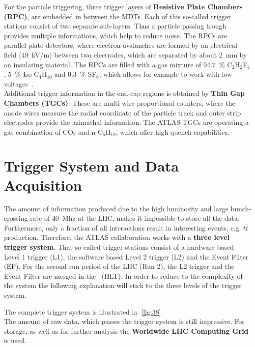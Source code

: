 \noindent For the particle triggering, three trigger layers of \textbf{Resistive Plate Chambers (RPC)}, are embedded  in between the MDTs. Each of this so-called trigger stations consist of two separate sub-layers. Thus a particle passing trough provides multiple informations, which help to reduce noise.  The RPCs are parallel-plate detectors, where electron avalanches are formed by an electrical field (49~kV/m) between two electrodes, which are separated by about 2~mm by an insulating material. The RPCs are filled with a gas mixture of 94.7~\%   C$_2$H$_2$F$_4$, 5~\% Iso-C$_4$H$_{10}$ and 0.3~\% SF$_6$, which allows for example to work with  low voltages~\cite{ATLAS:1999uwa}.\\ 

\noindent Additional trigger information in the end-cap regions is obtained by \textbf{Thin Gap Chambers (TGCs)}. These are multi-wire proportional counters, where the anode wires 
measure the radial coordinate of the particle track and outer strip electrodes provide the azimuthal information. The ATLAS TGCs are operating a gas combination of CO$_2$ and n-C$_5$H$_{12}$, which offer high quench capabilities.


\section{Trigger System and Data Acquisition}


\noindent The amount of information produced due to the  high luminosity and large bunch-crossing rate of 40~Mhz at the LHC, makes it impossible to store all the data. Furthermore, only a fraction of all interactions result in interesting events, e.g. $t\bar{t}$ production. Therefore, the ATLAS collaboration works with a \textbf{three level trigger system}. That so-called trigger stations consist of a hardware-based Level 1 trigger (L1), the software based Level 2 trigger (L2) and the Event Filter (EF). For the second run period of the LHC (Run 2), the L2 trigger and the Event Filter are merged in  the~ (HLT). In order to reduce to the complexity of the system the following explanation will stick to the three levels of the trigger system.


 The complete trigger system is illustrated in~\cref{fig:38} \\

\noindent The amount of raw data, which passes the trigger system is still impressive. For storage, as well as for further analysis the \textbf{Worldwide LHC Computing Grid} is used.\\

